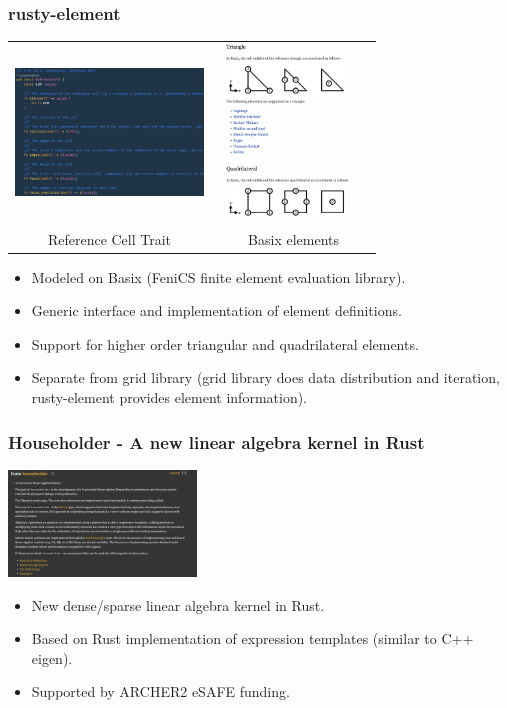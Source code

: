 \documentclass[dvipsnames,10pt]{beamer}
\begin{document}
\begin{frame}
\frametitle{rusty-element}

\begin{center}
\begin{tabular}{cc}
\includegraphics[width=5cm]{../figs/rusty_element} &
\includegraphics[width=4cm]{../figs/basix_elements}\\
Reference Cell Trait & {\small Basix elements}
\end{tabular}
\end{center}

\begin{itemize}
\item Modeled on Basix (FeniCS finite element evaluation library).
\item Generic interface and implementation of element definitions.
\item Support for higher order triangular and quadrilateral elements.
\item Separate from grid library (grid library does data distribution and
iteration, rusty-element provides element information).
\end{itemize}

\end{frame}

\begin{frame}
\frametitle{Householder - A new linear algebra kernel in Rust}

\begin{center}
\includegraphics[width=5cm]{../figs/householder}
\end{center}

\begin{itemize}
\item New dense/sparse linear algebra kernel in Rust.
\item Based on Rust implementation of expression templates (similar to C++ eigen).
\item Supported by ARCHER2 eSAFE funding.
\end{itemize}

\end{frame}
\end{document}

